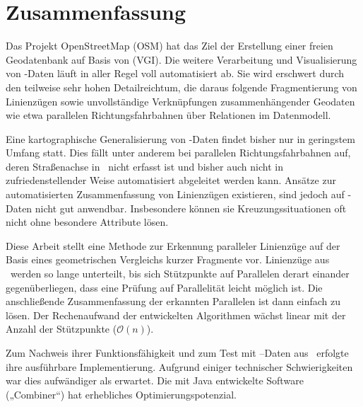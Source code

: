 \documentclass[../main/thesis.tex]{subfiles}
\begin{document}
\chapter{Zusammenfassung}
\label{ch:summary}

Das Projekt OpenStreetMap (OSM) hat das Ziel der Erstellung einer freien Geodatenbank auf Basis von  (VGI).
Die weitere Verarbeitung und Visualisierung von \osm-Daten läuft in aller Regel voll automatisiert ab.
Sie wird erschwert durch den teilweise sehr hohen Detailreichtum, die daraus folgende Fragmentierung von Linienzügen sowie unvollständige Verknüpfungen zusammenhängender Geodaten wie etwa parallelen Richtungsfahrbahnen über Relationen im Datenmodell.

Eine kartographische Generalisierung von \osm-Daten findet bisher nur in geringstem Umfang statt.
Dies fällt unter anderem bei parallelen Richtungsfahrbahnen auf, deren Straßenachse in \osm\ nicht erfasst ist und bisher auch nicht in zufriedenstellender Weise automatisiert abgeleitet werden kann.
Ansätze zur automatisierten Zusammenfassung von Linienzügen existieren, sind jedoch auf \osm-Daten nicht gut anwendbar.
Insbesondere können sie Kreuzungssituationen oft nicht ohne besondere Attribute lösen.

Diese Arbeit stellt eine Methode zur Erkennung paralleler Linienzüge auf der Basis eines geometrischen Vergleichs kurzer Fragmente vor.
Linienzüge aus \osm\ werden so lange unterteilt, bis sich Stützpunkte auf Parallelen derart einander gegenüberliegen, dass eine Prüfung auf Parallelität leicht möglich ist.
Die anschließende Zusammenfassung der erkannten Parallelen ist dann einfach zu lösen.
Der Rechenaufwand der entwickelten Algorithmen wächst linear mit der Anzahl der Stützpunkte ($\mathcal{O}(n)$).

Zum Nachweis ihrer Funktionsfähigkeit und zum Test mit --Daten aus \osm\ erfolgte ihre ausführbare Implementierung.
Aufgrund einiger technischer Schwierigkeiten war dies aufwändiger als erwartet.
Die mit Java entwickelte Software („Combiner“) hat erhebliches Optimierungspotenzial.
\end{document}
